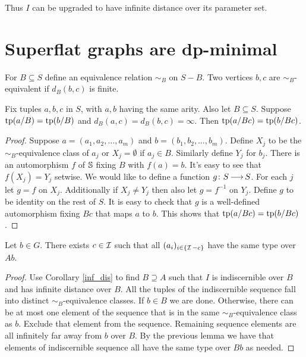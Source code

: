 Thus $I$ can be upgraded to have infinite distance over its parameter set.

\section{Superflat graphs are dp-minimal}

\begin{Definition}
  For $B \subseteq S$ define an equivalence relation $\sim_B$ on $S - B$.
  Two vertices $b,c$ are $\sim_B$-equivalent if $d_B(b,c)$ is finite.
\end{Definition}

\begin{Lemma}
  Fix tuples $a,b,c$ in $S$, with $a,b$ having the same arity.
  Also let $B \subseteq S$.
  Suppose $\operatorname{tp}(a/B) = \operatorname{tp}(b/B)$ and $d_B(a, c) = d_B(b, c) = \infty$.
  Then $\operatorname{tp}(a/Bc) = \operatorname{tp}(b/Bc)$.
\end{Lemma}

\begin{proof}
  Suppose $a = (a_1, a_2, \ldots, a_m)$ and $b = (b_1, b_2, \ldots, b_m)$.
  Define $X_j$ to be the $\sim_B$-equivalence class of $a_j$ or $X_j = \emptyset$ if $a_j \in B$.
  Similarly define $Y_j$ for $b_j$.
  There is an automorphism $f$ of $\mathbb S$ fixing $B$ with $f(a) = b$.
  It's easy to see that $f(X_j) = Y_j$ setwise.
  We would like to define a function $g \colon S \operatorname{\longrightarrow} S$.
  For each $j$ let $g = f$ on $X_j$.
  Additionally if $X_j \neq Y_j$ then also let $g = f^{-1}$ on $Y_j$.
  Define $g$ to be identity on the rest of $S$.
  It is easy to check that $g$ is a well-defined automorphism fixing $Bc$ that maps $a$ to $b$.
  This shows that $\operatorname{tp}(a/Bc) = \operatorname{tp}(b/Bc)$.
\end{proof}

\begin{Lemma} \label{exclude}
  Let $b \in G$.
  There exists $c \in \operatorname{\mathcal I}$ such that all $(a_i)_{i\in\{\operatorname{\mathcal I} - c\}}$ have the same type over $Ab$.
\end{Lemma}

\begin{proof}
  Use Corollary \ref{inf_dis} to find $B \supseteq A$ such that $I$ is indiscernible over $B$ and has infinite distance over $B$.
  All the tuples of the indiscernible sequence fall into distinct $\sim_B$-equivalence classes.
  If $b \in B$ we are done.
  Otherwise, there can be at most one element of the sequence that is in the same $\sim_B$-equivalence class as $b$.
  Exclude that element from the sequence.
  Remaining sequence elements are all infinitely far away from $b$ over $B$.
  By the previous lemma we have that elements of indiscernible sequence all have the same type over $Bb$ as needed.
\end{proof}


